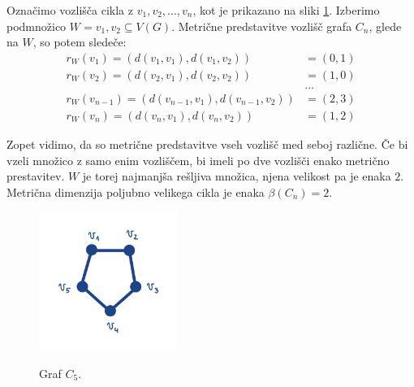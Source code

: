 \documentclass[mat1, tisk]{fmfdelo}
\begin{document}
\begin{primer}\label{pr:mdim_cikel}
    Označimo vozlišča cikla z $v_1, v_2, ..., v_n$, kot je prikazano na sliki \ref{fig:cikel}. 
    Izberimo podmnožico $W = {v_1, v_2} \subseteq V(G).$ Metrične predstavitve vozlišč grafa $C_n$, 
    glede na $W$, so potem sledeče:
    \begin{align*}
        r_W(v_1) = (d(v_1, v_1), d(v_1, v_2)) & = (0, 1) \\
        r_W(v_2) = (d(v_2, v_1), d(v_2, v_2)) & = (1, 0) \\
        & \dots \\
        r_W(v_{n-1}) = (d(v_{n-1}, v_1), d(v_{n-1}, v_2)) & = (2, 3) \\
        r_W(v_n) = (d(v_n, v_1), d(v_n, v_2)) & = (1, 2)
    \end{align*}
    
    Zopet vidimo, da so metrične predstavitve vseh vozlišč med seboj različne. Če bi vzeli 
    množico z samo enim vozliščem, bi imeli po dve vozlišči enako metrično prestavitev.
    $W$  je torej najmanjša rešljiva množica, njena velikost pa je enaka $2$. Metrična 
    dimenzija poljubno velikega cikla je enaka $\beta(C_n) = 2.$

    \begin{figure}[h]
        \caption{Graf $C_5$.}
        \centering
        \includegraphics[width=0.4\textwidth]{IMG_cikel.jpg}
        \label{fig:cikel}
    \end{figure}

\end{primer}
\end{document}
